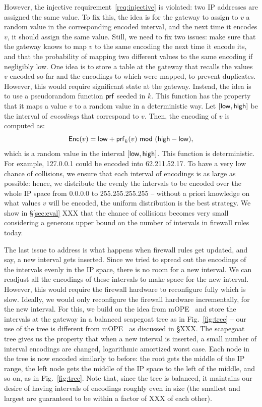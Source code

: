 However, the injective requirement~\ref{req:injective} is violated: two IP addresses are assigned the same value. 
To fix this, the idea is for the gateway to assign to $v$ a random value in the corresponding encoded interval, and the next time it encodes $v$, it should assign the same value. 
Still, we need to fix two issues: make sure that the gateway knows to map $v$ to the same encoding the next time it encode its, and that  the probability of mapping two different values to the same encoding if negligibly low.
One idea is to store a table at the gateway that recalls the values $v$ encoded  so far and the encodings to which were mapped, to prevent duplicates. However, this would require significant state at the gateway. Instead, the idea is to use a pseudorandom function $\mathsf{prf}$ seeded in $k$. This function has the property that it maps a value $v$ to a random value in a deterministic way.  Let $[\mathsf{low}, \mathsf{high}]$ be the interval of {\em encodings} that correspond to $v$. 
Then, the encoding of $v$ is computed as:
\[ \enc(v) = \low + \prf_k(v)\ \mod\ (\high - \low), \] 
which is  a random value in the interval $[\mathsf{low}, \mathsf{high}]$. This function is deterministic.
For example, 127.0.0.1 could be encoded into 62.211.52.17. 
To have a very low chance of collisions, we ensure that each interval of encodings is as large as possible: hence, we distribute the evenly the intervals to be encoded over the whole IP space from 0.0.0.0 to 255.255.255.255 -- without a priori knowledge on what values $v$ will be encoded, the uniform distribution is the best strategy. We show in \S\ref{sec:eval} XXX that the chance of collisions becomes very small considering a generous upper bound on the number of intervals in firewall rules today.


The last issue to address is what happens when firewall rules get updated, and say, a new interval gets inserted. 
Since we tried to spread out the encodings of the intervals evenly in the IP space, there is no room for a new interval. We can 
readjust all the encodings of these intervals to make space for the new interval. However, this would require the firewall hardware to reconfigure fully which is slow. Ideally, we would only reconfigure the firewall hardware incrementally, for the new interval. For this, we build on the idea from mOPE~\cite{popa:mope} and store the intervals at the gateway in a balanced scapegoat tree as in Fig.~\ref{fig:tree} -- our use of the tree is different from mOPE~\cite{popa:mope} as discussed in \S XXX.  The scapegoat tree gives us the property that when a new interval is inserted, a small number of interval encodings are changed, logarithmic amortized worst case. Each node in the tree is now encoded similarly to before: the root gets the middle of the IP range,  the left node gets the middle of the IP space to the left of the middle, and so on, as in Fig.~\ref{fig:tree}.  Note that, since the tree is balanced, it maintains our desire of having intervals of encodings roughly even in size (the smallest and largest are guaranteed to be within a factor of XXX of each other).

